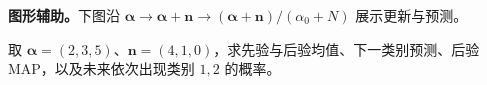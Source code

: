 \documentclass[UTF8,a4paper,11pt,openany]{ctexbook}
\begin{document}
\setcounter{page}{842}
\setcounter{chapter}{34}
\setcounter{section}{5}
\setcounter{figure}{9}
\setcounter{equation}{23}
\pagestyle{headings}
\textbf{图形辅助。}下图沿 $\boldsymbol\alpha\to\boldsymbol\alpha+\boldsymbol n\to(\boldsymbol\alpha+\boldsymbol n)/(\alpha_0+N)$ 展示更新与预测。

\FloatBarrier

\begin{example}
取 $\boldsymbol\alpha=(2,3,5)$、$\boldsymbol n=(4,1,0)$，求先验与后验均值、下一类别预测、后验 MAP，以及未来依次出现类别 $1,2$ 的概率。
\end{example}
\end{document}
